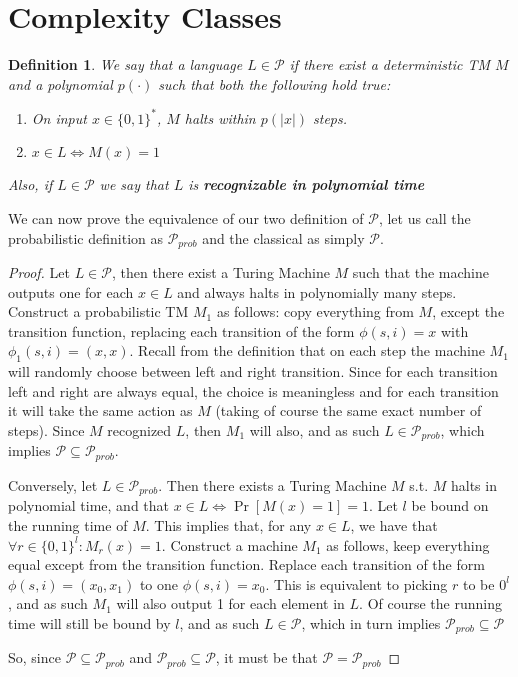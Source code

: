 \documentclass{article}
\newtheorem{definition}{Definition}
\begin{document}
\section{Complexity Classes}
\begin{definition}
We say that a language $L \in \mathcal{P}$ if there exist a deterministic TM $M$ and a polynomial $p(\cdot)$ such that both the following hold true:
\begin{enumerate}
    \item On input $x \in \{0, 1\}^*$, $M$ halts within $p(|x|)$ steps.
    \item $x \in L \iff M(x) = 1$
\end{enumerate}
Also, if $L \in \mathcal{P}$ we say that $L$ is \textbf{recognizable in polynomial time}
\end{definition}

We can now prove the equivalence of our two definition of $\mathcal{P}$, let us call the probabilistic definition as $\mathcal{P}_{prob}$ and the classical as simply $\mathcal{P}$.

\begin{proof}
Let $L \in \mathcal{P}$, then there exist a Turing Machine $M$ such that the machine outputs one for each $x \in L$ and always halts in polynomially many steps. 
Construct a probabilistic TM $M_1$ as follows: copy everything from $M$, except the transition function, replacing each transition of the form $\phi(s, i) = x$ with $\phi_1(s, i) = (x, x)$. Recall from the definition that on each step the machine $M_1$ will randomly choose between left and right transition. Since for each transition left and right are always equal, the choice is meaningless and for each transition it will take the same action as $M$ (taking of course the same exact number of steps). Since $M$ recognized $L$, then $M_1$ will also, and as such $L \in \mathcal{P}_{prob}$, which implies $\mathcal{P} \subseteq \mathcal{P}_{prob}$.  \par

Conversely, let $L \in \mathcal{P}_{prob}$. Then there exists a Turing Machine $M$ s.t. $M$ halts in polynomial time, and that $ x \in L \iff \Pr[M(x) = 1] = 1$. Let $l$ be bound on the running time of $M$. This implies that, for any $x \in L$, we have that $\forall r \in \{0,1\}^l : M_r(x) = 1$. Construct a machine $M_1$ as follows, keep everything equal except from the transition function. Replace each transition of the form $\phi(s, i) = (x_0, x_1)$ to one $\phi(s, i) = x_0$. This is equivalent to picking $r$ to be $0^l$, and as such $M_1$ will also output 1 for each element in $L$. Of course the running time will still be bound by $l$, and as such $L \in \mathcal{P}$, which in turn implies $\mathcal{P}_{prob} \subseteq \mathcal{P}$  \par

So, since $\mathcal{P} \subseteq \mathcal{P}_{prob}$ and $\mathcal{P}_{prob} \subseteq \mathcal{P}$, it must be that $\mathcal{P} = \mathcal{P}_{prob}$
\end{proof}
\end{document}
